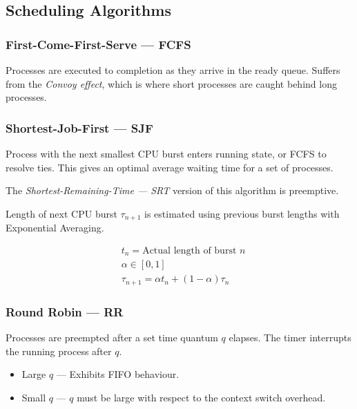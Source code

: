 \subsection{Scheduling Algorithms}


\subsubsection{First-Come-First-Serve --- FCFS}

Processes are executed to completion as they arrive in the ready queue.
Suffers from the \textit{Convoy effect}, which is where short processes are
caught behind long processes.


\subsubsection{Shortest-Job-First --- SJF}

Process with the next smallest CPU burst enters running state, or FCFS to
resolve ties. This gives an optimal average waiting time for a set of processes.

The \textit{Shortest-Remaining-Time --- SRT} version of this algorithm is preemptive.

Length of next CPU burst $\tau_{n+1}$ is estimated using previous burst lengths with
Exponential Averaging.

\begin{equation}
    \begin{split}
        &t_n=\textrm{Actual length of burst }n \\
        &\alpha\in[0,1] \\
        &\tau_{n+1}=\alpha t_n+(1-\alpha)\tau_n
    \end{split}
\end{equation}


\subsubsection{Round Robin --- RR}

Processes are preempted after a set time quantum $q$ elapses.
The timer interrupts the running process after $q$.

\begin{itemize}
    \item Large $q$ --- Exhibits FIFO behaviour.
    \item Small $q$ --- $q$ must be large with respect to the context switch overhead.
\end{itemize}

